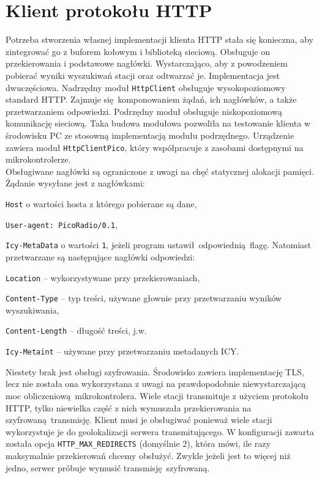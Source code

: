\documentclass[polish]{aghengthesis}
\let\tempone\itemize
\let\temptwo\enditemize
\renewenvironment{itemize}{\tempone\setlength{\itemsep}{0cm}}{\temptwo}
\begin{document}
	\section{Klient protokołu HTTP}
		Potrzeba stworzenia własnej implementacji klienta HTTP stała się konieczna, aby zintegrować go z buforem kołowym i biblioteką sieciową. Obsługuje on przekierowania i podstawowe nagłówki. Wystarczająco, aby z powodzeniem pobierać wyniki wyszukiwań stacji oraz odtwarzać je. Implementacja jest dwuczęściowa. Nadrzędny moduł \lstinline|HttpClient| obsługuje wysokopoziomowy standard HTTP. Zajmuje się komponowaniem żądań, ich nagłówków, a także przetwarzaniem odpowiedzi. Podrzędny moduł obsługuje niskopoziomową komunikację sieciową. Taka budowa modułowa pozwoliła na testowanie klienta w środowisku PC ze stosowną implementacją modułu podrzędnego. Urządzenie zawiera moduł \lstinline|HttpClientPico|, który współpracuje z zasobami dostępnymi na mikrokontrolerze.
		$ $\\
		
		Obsługiwane nagłówki są ograniczone z uwagi na chęć statycznej alokacji pamięci. Żądanie wysyłane jest z nagłówkami:
		\begin{itemize}
			\item \lstinline|Host| o wartości hosta z którego pobierane są dane,
			\item \lstinline|User-agent: PicoRadio/0.1|,
			\item \lstinline|Icy-MetaData| o wartości \lstinline|1|, jeżeli program ustawił odpowiednią flagę.
		\end{itemize}
		Natomiast przetwarzane są następujące nagłówki odpowiedzi:
		\begin{itemize}
			\item \lstinline|Location| -- wykorzystywane przy przekierowaniach,
			\item \lstinline|Content-Type| -- typ treści, używane głownie przy przetwarzaniu wyników wyszukiwania,
			\item \lstinline|Content-Length| -- długość treści, j.w.
			\item \lstinline|Icy-Metaint| -- używane przy przetwarzaniu metadanych ICY.
		\end{itemize}
		
		Niestety brak jest obsługi szyfrowania. Środowisko zawiera implementację TLS, lecz nie została ona wykorzystana z uwagi na prawdopodobnie niewystarczającą moc obliczeniową mikrokontrolera. Wiele stacji transmituje z użyciem protokołu HTTP, tylko niewielka część z nich wymuszała przekierowania na szyfrowaną transmisję. Klient musi je obsługiwać ponieważ wiele stacji wykorzystuje je do geolokalizacji serwera transmitującego. W konfiguracji zawarta została opcja \lstinline|HTTP_MAX_REDIRECTS| (domyślnie 2), która mówi, ile razy maksymalnie przekierowań chcemy obsłużyć. Zwykle jeżeli jest to więcej niż jedno, serwer próbuje wymusić transmisję szyfrowaną.
		
\end{document}
